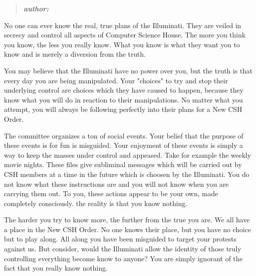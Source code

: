 \documentclass[9pt]{extarticle}
\begin{document}
%
%
\begin{minipage}[t]{.61\linewidth} %
\vspace{-0.4cm}
\hypertarget{firstnews}{}
\begin{quote}
\centering
\textbf{\textit{author: }}
\end{quote}

No one can ever know the real, true plans of the Illuminati. They are veiled 
in secrecy and control all aspects of Computer Science House. The more you 
think you know, the less you really know. What you know is what they want 
you to know and is merely a diversion from the truth. 

You may believe that the Illuminati have no power over you, but the truth is 
that every day you are being manipulated. Your "choices" to try and stop 
their underlying control are choices which they have caused to happen, because
they know what you will do in reaction to their manipulations. No matter what
you attempt, you will always be following perfectly into their plans for a 
New CSH Order. 

The committee organizes a ton of social events. Your belief that the purpose of
these events is for fun is misguided. Your enjoyment of these events is simply
a way to keep the masses under control and appeased. Take for example the weekly
movie nights. These files give subliminal messages which will be carried out by
CSH members at a time in the future which is choosen by the Illuminati. You
do not know what these instructions are and you will not know when you are
carrying them out. To you, these actions appear to be your own, made completely
consciously. the reality is that you know nothing. 

The harder you try to know more, the further from the true you are. We all have a 
place in the New CSH Order. No one knows their place, but you have no choice 
but to play along. All along you have been misguided to target your protests 
against us. But consider, would the Illuminati allow the identity of those 
truly controlling everything become know to anyone? You are simply ignorant of
the fact that you really know nothing.



\end{minipage}
\end{document}
